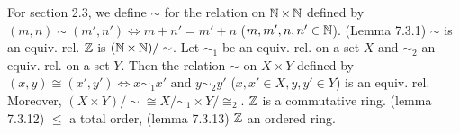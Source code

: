  For section 2.3, we define $\sim$ for the relation on $\operatorname{\mathbb{N}} \times \operatorname{\mathbb{N}}$ defined by $(m, n) \sim (m', n') \iff m + n' = m' + n$ ($m, m', n, n' \in \operatorname{\mathbb{N}}$). (Lemma 7.3.1) $\sim$ is an equiv. rel.
 $\operatorname{\mathbb{Z}}$ is $(\operatorname{\mathbb{N}} \times \operatorname{\mathbb{N}}) / \sim$.
 Let $\sim_1$ be an equiv. rel. on a set $X$ and $\sim_2$ an equiv. rel. on a set $Y$. Then the relation $\sim$ on $X \times Y$ defined by $(x, y) \cong (x', y') \iff x \sim_1 x' \text{ and } y \sim_2 y'$ ($x, x' \in X, y, y' \in Y$) is an equiv. rel. Moreover, $(X \times Y) / \sim \cong X / \sim_1 \times Y / \cong_2$.
 $\operatorname{\mathbb{Z}}$ is a commutative ring. (lemma 7.3.12) $\leq$ a total order, (lemma 7.3.13) $\operatorname{\mathbb{Z}}$ an ordered ring.
